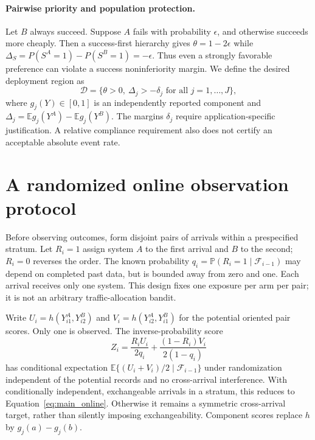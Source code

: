 \documentclass[11pt,letterpaper]{article}
\newcommand{\E}{\mathbb E}
\newcommand{\Prob}{\mathbb P}
\begin{document}
\paragraph{Pairwise priority and population protection.}
Let $B$ always succeed. Suppose $A$ fails with probability $\epsilon$,
and otherwise succeeds more cheaply. Then a success-first hierarchy gives
$\theta=1-2\epsilon$ while
$\Delta_S=P(S^A=1)-P(S^B=1)=-\epsilon$.
Thus even a strongly favorable preference can violate a success
noninferiority margin. We define the desired deployment region as
\begin{equation}
 \mathcal D=\{\theta>0,\ \Delta_j> -\delta_j\text{ for all }j=1,\ldots,J\},
 \label{eq:main_region}
\end{equation}
where $g_j(Y)\in[0,1]$ is an independently reported component and
$\Delta_j=\E g_j(Y^A)-\E g_j(Y^B)$. The margins $\delta_j$ require
application-specific justification. A relative compliance requirement
also does not certify an acceptable absolute event rate.

\section{A randomized online observation protocol}
\label{sec:online}
Before observing outcomes, form disjoint pairs of arrivals within a
prespecified stratum. Let $R_i=1$ assign system $A$ to the first arrival
and $B$ to the second; $R_i=0$ reverses the order. The known probability
$q_i=\Prob(R_i=1\mid\mathcal F_{i-1})$ may depend on completed past data,
but is bounded away from zero and one. Each arrival receives only one
system. This design fixes one exposure per arm per pair; it is not an
arbitrary traffic-allocation bandit.

Write $U_i=h(Y^A_{i1},Y^B_{i2})$ and
$V_i=h(Y^A_{i2},Y^B_{i1})$ for the potential oriented pair scores. Only
one is observed. The inverse-probability score
\begin{equation}
 Z_i=\frac{R_iU_i}{2q_i}+
          \frac{(1-R_i)V_i}{2(1-q_i)}
 \label{eq:main_ht}
\end{equation}
has conditional expectation $\E\{(U_i+V_i)/2\mid\mathcal F_{i-1}\}$
under randomization independent of the potential records and no
cross-arrival interference. With conditionally independent, exchangeable
arrivals in a stratum, this reduces to
Equation~\eqref{eq:main_online}. Otherwise it remains a symmetric
cross-arrival target, rather than silently imposing exchangeability.
Component scores replace $h$ by $g_j(a)-g_j(b)$.
\end{document}
